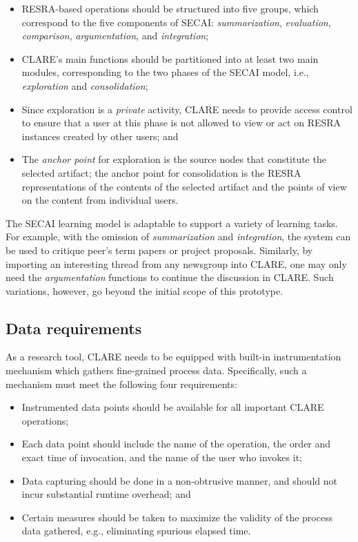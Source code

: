 \begin{itemize}
\item RESRA-based operations should be structured into five groups, which
  correspond to the five components of SECAI: {\it summarization\/}, {\it
  evaluation\/}, {\it comparison\/}, {\it argumentation\/}, and {\it
  integration\/};
  
\item CLARE's main functions should be partitioned into at least two main
  modules, corresponding to the two phases of the SECAI model, i.e., {\it
  exploration\/} and {\it consolidation\/};
  
\item Since exploration is a {\it private} activity, CLARE needs to provide
  access control to ensure that a user at this phase is not allowed to view
  or act on RESRA instances created by other users; and
  
\item The {\it anchor point} for exploration is the source nodes that
  constitute the selected artifact; the anchor point for consolidation is
  the RESRA representations of the contents of the selected artifact and
  the points of view on the content from individual users.
\end{itemize}

The SECAI learning model is adaptable to support a variety of learning
tasks. For example, with the omission of {\it summarization\/} and {\it
integration\/}, the system can be used to critique peer's term papers or
project proposals. Similarly, by importing an interesting thread from any
newsgroup into CLARE, one may only need the {\it argumentation\/} functions
to continue the discussion in CLARE. Such variations, however, go beyond
the initial scope of this prototype.


\subsection{Data requirements}
\label{sec:data requirements}

As a research tool, CLARE needs to be equipped with built-in
instrumentation mechanism which gathers fine-grained process data.
Specifically, such a mechanism must meet the following four requirements:

\begin{itemize}
\item Instrumented data points should be available for all important CLARE
  operations;
  
\item Each data point should include the name of the operation, the order
  and exact time of invocation, and the name of the user who invokes it;
  
\item Data capturing should be done in a non-obtrusive manner, and should
  not incur substantial runtime overhead; and
  
\item Certain measures should be taken to maximize the validity of
  the process data gathered, e.g., eliminating spurious elapsed time.
\end{itemize}

